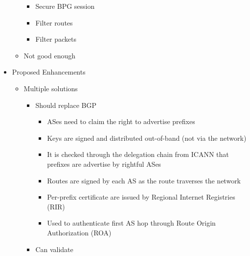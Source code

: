 \begin{itemize}
\begin{itemize}
                \begin{itemize}
                    \item Secure BPG session
                    \item Filter routes
                    \item Filter packets
                \end{itemize}
            \item Not good enough
        \end{itemize}
    \item Proposed Enhancements
        \begin{itemize}
            \item Multiple solutions
                \begin{itemize}
                    \item Should replace BGP
                        \begin{itemize}
                            \item ASes need to claim the right to advertise prefixes
                            \item Keys are signed and distributed out-of-band (not via the network)
                            \item It is checked through the delegation chain from ICANN that prefixes are advertise by rightful ASes
                        \end{itemize}
                        \begin{itemize}
                            \item Routes are signed by each AS as the route traverses the network
                        \end{itemize}
                        \begin{itemize}
                            \item Per-prefix certificate are issued by Regional Internet Registries (RIR)
                            \item Used to authenticate first AS hop through Route Origin Authorization (ROA)
                        \end{itemize}
                    \item Can validate
                        \begin{itemize}

\end{itemize}
\end{itemize}
\end{itemize}
\end{itemize}
